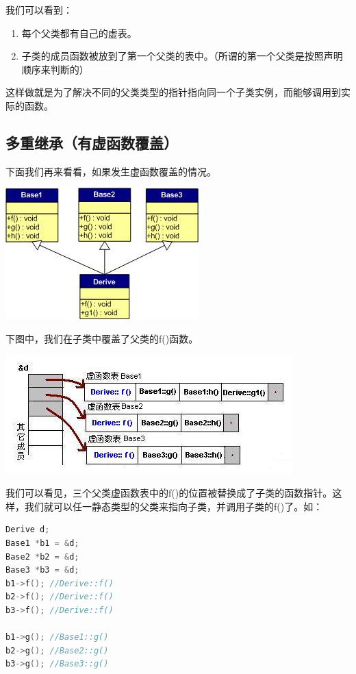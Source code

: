 \documentclass{article}
\begin{document}
\begin{CJK}{UTF8}{gbsn}
 我们可以看到：
\begin{enumerate}
\item 每个父类都有自己的虚表。
\item 子类的成员函数被放到了第一个父类的表中。（所谓的第一个父类是按照声明顺序来判断的）
\end{enumerate}
这样做就是为了解决不同的父类类型的指针指向同一个子类实例，而能够调用到实际的函数。

\subsection{多重继承（有虚函数覆盖）}
下面我们再来看看，如果发生虚函数覆盖的情况。

 \includegraphics{m7.jpg}
 
下图中，我们在子类中覆盖了父类的f()函数。

\includegraphics{m8.jpg}

我们可以看见，三个父类虚函数表中的f()的位置被替换成了子类的函数指针。这样，我们就可以任一静态类型的父类来指向子类，并调用子类的f()了。如：
\begin{lstlisting}[language=c++]
Derive d;
Base1 *b1 = &d;
Base2 *b2 = &d;
Base3 *b3 = &d;
b1->f(); //Derive::f()
b2->f(); //Derive::f()
b3->f(); //Derive::f()
 
b1->g(); //Base1::g()
b2->g(); //Base2::g()
b3->g(); //Base3::g()
\end{lstlisting} 


\end{CJK}
\end{document}
